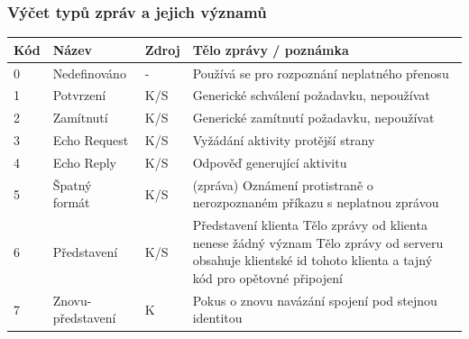 \documentclass[12pt,a4paper]{article}
\begin{document}
\subsubsection{Výčet typů zpráv a jejich významů}
\begin{table}[h]
\center
\begin{tabular}{|l|p{3cm}|l|p{10cm}|}
\hline
\textbf{Kód} & \textbf{Název} & \textbf{Zdroj} & \textbf{Tělo zprávy / poznámka}\\ \hline
0 & Nedefinováno & - & Používá se pro rozpoznání neplatného přenosu \\ \hline
1 & Potvrzení & K/S & Generické schválení požadavku, nepoužívat \\ \hline
2 & Zamítnutí & K/S & Generické zamítnutí požadavku, nepoužívat \\ \hline
3 & Echo Request & K/S & Vyžádání aktivity protější strany \\ \hline
4 & Echo Reply & K/S & Odpověď generující aktivitu \\ \hline
5 & Špatný formát & K/S & (zpráva) Oznámení protistraně o nerozpoznaném příkazu s neplatnou zprávou\\ \hline
6 & Představení & K/S & Představení klienta \newline Tělo zprávy od klienta nenese žádný význam \newline Tělo zprávy od serveru obsahuje klientské id tohoto klienta a tajný kód pro opětovné připojení \\ \hline
7 & Znovu-představení & K & Pokus o znovu navázání spojení pod stejnou identitou \\ \hline

\end{tabular}
\end{table}
\end{document}
